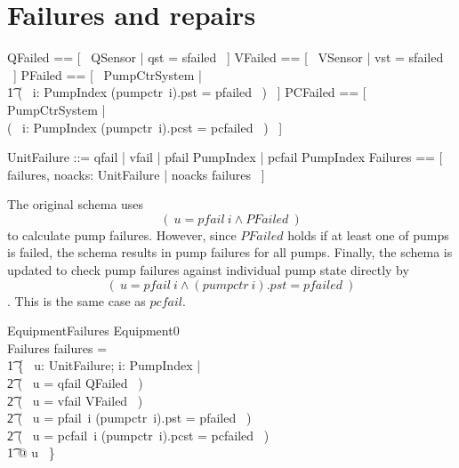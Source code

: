 \documentclass{report} %
\begin{document}
\section{Failures and repairs}

\begin{zed}
  QFailed == [~ QSensor | qst = sfailed ~]
  \also %
  VFailed == [~ VSensor | vst = sfailed ~]
  \also %
  PFailed == [~ PumpCtrSystem | \\
      \t1 (~ \exists i: PumpIndex \spot (pumpctr~i).pst = pfailed ~) ~]
  \also %
  PCFailed == [~ PumpCtrSystem | \\
      (~ \exists i: PumpIndex \spot (pumpctr~i).pcst = pcfailed ~) ~]
\end{zed}

\begin{zed}
  UnitFailure ::= qfail | vfail | pfail \ldata PumpIndex \rdata | pcfail \ldata PumpIndex \rdata
  \also %
  Failures == [~ failures, noacks: \power UnitFailure | noacks \subseteq failures ~]
\end{zed}

The original schema uses \[(~ u = pfail~i \land PFailed ~) \] to calculate pump failures. However, since $PFailed$ holds if at least one of pumps is failed, the schema results in pump failures for all pumps. Finally, the schema is updated to check pump failures against individual pump state directly by \[(~ u = pfail~i \land (pumpctr~i).pst = pfailed ~) \]. This is the same case as $pcfail$.

\begin{schema}{EquipmentFailures}
  Equipment0
  \\ %
  Failures
  \where %
  failures =
  \\ %
  \t1
    \{~ u: UnitFailure; i: PumpIndex | \\ %
    \t2 (~ u = qfail \land QFailed ~) \lor {} \\
    \t2 (~ u = vfail \land VFailed ~) \lor {} %
      \\ %
    \t2 (~ u = pfail~i \land (pumpctr~i).pst = pfailed ~) \lor {} \\
    \t2 (~ u = pcfail~i \land (pumpctr~i).pcst = pcfailed ~) \\
     \t1 @ u ~\}
\end{schema}
\end{document}
